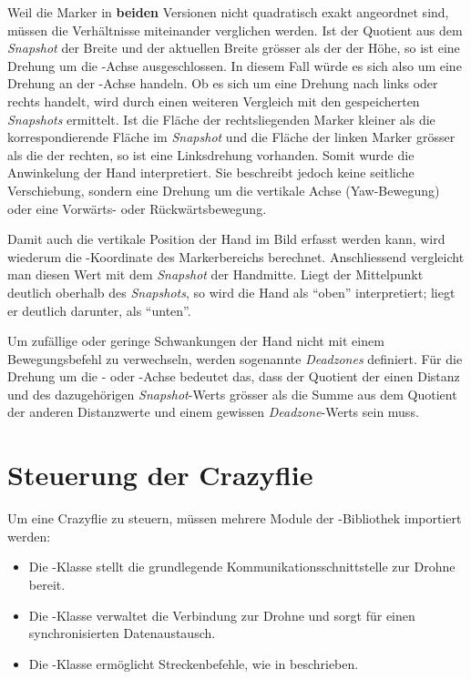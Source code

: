 Weil die Marker in \textbf{beiden} Versionen nicht quadratisch exakt angeordnet sind, müssen die Verhältnisse miteinander verglichen werden.
Ist der Quotient aus dem \textit{Snapshot} der Breite und der aktuellen Breite grösser als der der Höhe, so ist eine Drehung um die -Achse ausgeschlossen.
In diesem Fall würde es sich also um eine Drehung an der -Achse handeln.
Ob es sich um eine Drehung nach links oder rechts handelt, wird durch einen weiteren Vergleich mit den gespeicherten \textit{Snapshots} ermittelt.
Ist die Fläche der rechtsliegenden Marker kleiner als die korrespondierende Fläche im \textit{Snapshot} und die Fläche der linken Marker grösser als die der rechten, so ist eine Linksdrehung vorhanden.
Somit wurde die Anwinkelung der Hand interpretiert.
Sie beschreibt jedoch keine seitliche Verschiebung, sondern eine Drehung um die vertikale Achse (Yaw-Bewegung) oder eine Vorwärts- oder Rückwärtsbewegung.

Damit auch die vertikale Position der Hand im Bild erfasst werden kann, wird wiederum die -Koordinate des Markerbereichs berechnet.
Anschliessend vergleicht man diesen Wert mit dem \textit{Snapshot} der Handmitte.
Liegt der Mittelpunkt deutlich oberhalb des \textit{Snapshots}, so wird die Hand als \enquote{oben} interpretiert; liegt er deutlich darunter, als \enquote{unten}.

Um zufällige oder geringe Schwankungen der Hand nicht mit einem Bewegungsbefehl zu verwechseln, werden sogenannte \textit{Deadzones} definiert.
Für die Drehung um die - oder -Achse bedeutet das, dass der Quotient der einen Distanz und des dazugehörigen \textit{Snapshot}-Werts grösser als die Summe aus dem Quotient der anderen Distanzwerte und einem gewissen \textit{Deadzone}-Werts sein muss.

\section{Steuerung der Crazyflie}
\label{sec:cf_co}
Um eine Crazyflie zu steuern, müssen mehrere Module der -Bibliothek importiert werden:

\begin{itemize}
    \item Die -Klasse stellt die grundlegende Kommunikationsschnittstelle zur Drohne bereit.
    \item Die -Klasse verwaltet die Verbindung zur Drohne und sorgt für einen synchronisierten Datenaustausch.
    \item Die -Klasse ermöglicht Streckenbefehle, wie in  beschrieben.
\end{itemize}

